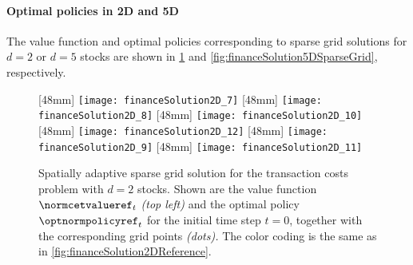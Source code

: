 \paragraph{Optimal policies in 2D and 5D}

The value function and optimal policies corresponding to
sparse grid solutions for $d = 2$ or $d = 5$ stocks are shown in
\cref{fig:financeSolution2DSparseGrid} and
\cref{fig:financeSolution5DSparseGrid}, respectively.


\begin{figure}
  [48mm]{%
    \texttt{[image: financeSolution2D\_7]}%
  }%
  \hfill%
  [48mm]{%
    \texttt{[image: financeSolution2D\_8]}%
  }%
  \hfill%
  [48mm]{%
    \texttt{[image: financeSolution2D\_10]}%
  }%
  \\[2mm]%
  [48mm]{%
    \texttt{[image: financeSolution2D\_12]}%
  }%
  \hfill%
  [48mm]{%
    \texttt{[image: financeSolution2D\_9]}%
  }%
  \hfill%
  [48mm]{%
    \texttt{[image: financeSolution2D\_11]}%
  }%
  \caption[Sparse grid solution for the two-dimensional TCP]{%
    Spatially adaptive sparse grid solution for the transaction costs problem
    with $d = 2$ stocks.
    \vspace{-0.15em}%
    Shown are the value function $\normcetvalueref_t$ \emph{(top left)} and the
    optimal policy $\optnormpolicyref_t$ for the initial time step $t = 0$,
    together with the corresponding grid points \emph{(dots).}
    The color coding is the same as in
    \cref{fig:financeSolution2DReference}.%
  }%
  \label{fig:financeSolution2DSparseGrid}%
\end{figure}

